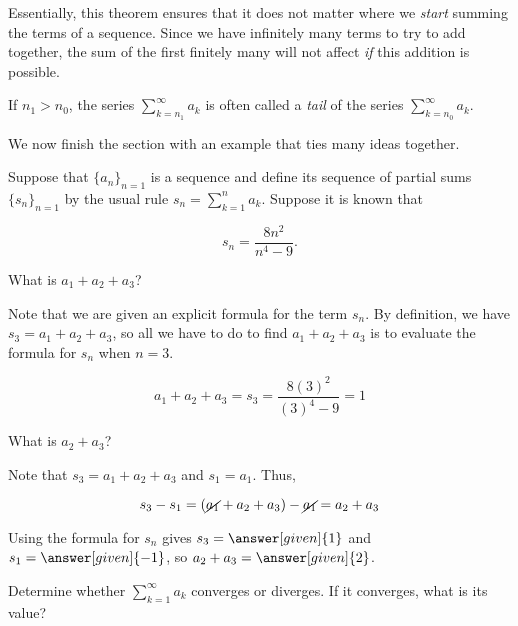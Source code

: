 \documentclass{ximera}
\begin{document}
Essentially, this theorem ensures that it does not matter where we \emph{start} summing the terms of a sequence.  Since we have infinitely many terms to try to add together, the sum of the first finitely many will not affect \emph{if} this addition is possible.

\begin{remark}
If $n_1>n_0$, the series $\sum\limits_{k=n_1}^{\infty} a_k$ is often called a \emph{tail} of the series $\sum\limits_{k=n_0}^{\infty} a_k$.
\end{remark}

We now finish the section with an example that ties many ideas together.


\begin{example}
Suppose that $\{a_n\}_{n=1}$ is a sequence and define its sequence of partial sums $\{s_n\}_{n=1}$ by the usual rule $s_n = \sum\limits_{k=1}^n a_k$.  Suppose it is known that

\[
s_n = \frac{8n^2}{n^4-9}.
\]

\begin{question}
What is $a_1+a_2+a_3$?  

\begin{explanation}
Note that we are given an explicit formula for the term $s_n$.  By definition, we have $s_3 = a_1+a_2+a_3$, so all we have to do to find $a_1+a_2+a_3$ is to evaluate the formula for $s_n$ when $n=3$.

\[
a_1+a_2+a_3 = s_3 = \frac{8(3)^2}{(3)^4-9} = 1
\]

\end{explanation}
\end{question}

\begin{question}
What is $a_2+a_3$?

\begin{explanation}
Note that $s_3 = a_1+a_2+a_3$ and $s_1 = a_1$.  Thus, 

\[s_3 -s_1 = \left(\cancel{a_1}+ a_2+a_3\right) -\cancel{a_1} = a_2+a_3\]

Using the formula for $s_n$ gives $s_3 = \answer[given]{1}$ and $s_1=\answer[given]{-1}$, so $a_2+a_3 =  \answer[given]{2}$.
\end{explanation}
\end{question}

\begin{question}
Determine whether $\sum\limits_{k=1}^{\infty} a_k$ converges or diverges.  If it converges, what is its value?


\end{question}
\end{example}
\end{document}
